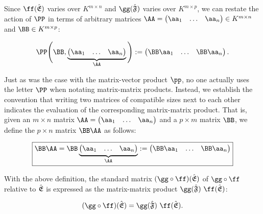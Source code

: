\begin{deriv}
    Since $\ff(\sE)$ varies over $K^{m \times n}$ and $\gg(\sF)$ varies over $K^{m \times p}$, we can restate the action of $\PP$ in terms of arbitrary matrices $\AA = \begin{pmatrix} \aa_1 & \hdots & \aa_n \end{pmatrix} \in K^{m \times n}$ and $\BB \in K^{m \times p}$:
    
    \begin{align*}
        \PP \Bigg(\BB, \underbrace{\begin{pmatrix} \aa_1 & \hdots & \aa_n \end{pmatrix}}_\AA \Bigg) := 
        \begin{pmatrix} \BB \aa_1 & \hdots & \BB \aa_n \end{pmatrix}.
    \end{align*}
    
    Just as was the case with the matrix-vector product $\pp$, no one actually uses the letter $\PP$ when notating matrix-matrix products. Instead, we establish the convention that writing two matrices of compatible sizes next to each other indicates the evaluation of the corresponding matrix-matrix product. That is, given an $m \times n$ matrix $\AA = \begin{pmatrix} \aa_1 & \hdots & \aa_n \end{pmatrix}$ and a $p \times m$ matrix $\BB$, we define the $p \times n$ matrix $\BB \AA$ as follows:

    \begin{align*}
        \boxed
        {
            \BB \AA 
            =
            \BB
            \underbrace
            {\begin{pmatrix} 
                \aa_1 & \hdots & \aa_n
            \end{pmatrix}}_\AA
            := \begin{pmatrix} \BB \aa_1 & \hdots & \BB \aa_n \end{pmatrix}
        }
    \end{align*}
    
    With the above definition, the standard matrix $(\gg \circ \ff)(\sE)$ of $\gg \circ \ff$ relative to ${\hat{\mathfrak{E}}}$ is expressed as the matrix-matrix product $\gg(\sF) \spc \ff(\sE)$:
    
    \begin{align*}
        (\gg \circ \ff)(\sE) = \gg(\sF) \spc \ff(\sE).
    \end{align*}
\end{deriv}

